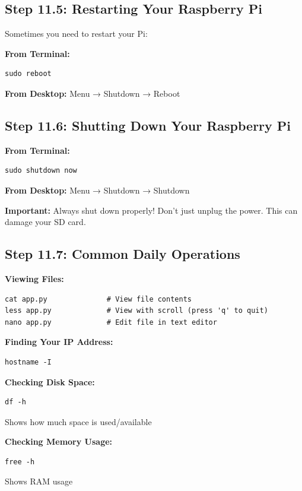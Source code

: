 \documentclass[12pt,a4paper]{article}
\begin{document}
\subsection{Step 11.5: Restarting Your Raspberry Pi}

Sometimes you need to restart your Pi:

\textbf{From Terminal:}
\begin{lstlisting}
sudo reboot
\end{lstlisting}

\textbf{From Desktop:}
Menu → Shutdown → Reboot

\subsection{Step 11.6: Shutting Down Your Raspberry Pi}

\textbf{From Terminal:}
\begin{lstlisting}
sudo shutdown now
\end{lstlisting}

\textbf{From Desktop:}
Menu → Shutdown → Shutdown

\begin{warningbox}
\textbf{Important:} Always shut down properly! Don't just unplug the power. This can damage your SD card.
\end{warningbox}

\subsection{Step 11.7: Common Daily Operations}

\textbf{Viewing Files:}
\begin{lstlisting}
cat app.py              # View file contents
less app.py             # View with scroll (press 'q' to quit)
nano app.py             # Edit file in text editor
\end{lstlisting}

\textbf{Finding Your IP Address:}
\begin{lstlisting}
hostname -I
\end{lstlisting}

\textbf{Checking Disk Space:}
\begin{lstlisting}
df -h
\end{lstlisting}
Shows how much space is used/available

\textbf{Checking Memory Usage:}
\begin{lstlisting}
free -h
\end{lstlisting}
Shows RAM usage
\end{document}
